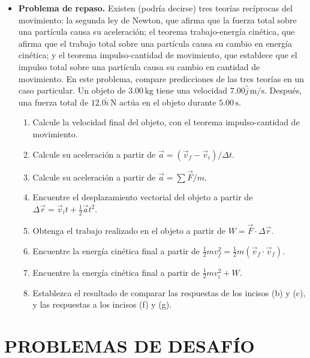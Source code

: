 \documentclass[11pt,a4paper]{article}
\begin{document}
\begin{itemize}
    \item[\textbf{51.}] \textbf{Problema de repaso.} Existen (podría decirse) tres teorías recíprocas del movimiento: la segunda ley de Newton, que afirma que la fuerza total sobre una partícula causa su aceleración; el teorema trabajo-energía cinética, que afirma que el trabajo total sobre una partícula causa su cambio en energía cinética; y el teorema impulso-cantidad de movimiento, que establece que el impulso total sobre una partícula causa su cambio en cantidad de movimiento. En este problema, compare predicciones de las tres teorías en un caso particular. Un objeto de \(3.00\,\text{kg}\) tiene una velocidad \(7.00\hat{j}\,\text{m/s}\). Después, una fuerza total de \(12.0\hat{i}\,\text{N}\) actúa en el objeto durante \(5.00\,\text{s}\).
    \begin{enumerate}
        \item Calcule la velocidad final del objeto, con el teorema impulso-cantidad de movimiento.
        \item Calcule su aceleración a partir de \(\vec{a} = (\vec{v}_f - \vec{v}_i)/\Delta t\).
        \item Calcule su aceleración a partir de \(\vec{a} = \sum \vec{F}/m\).
        \item Encuentre el desplazamiento vectorial del objeto a partir de \(\Delta \vec{r} = \vec{v}_i t + \frac{1}{2}\vec{a}t^2\).
        \item Obtenga el trabajo realizado en el objeto a partir de \(W = \vec{F} \cdot \Delta \vec{r}\).
        \item Encuentre la energía cinética final a partir de \(\frac{1}{2}m v_f^2 = \frac{1}{2}m(\vec{v}_f \cdot \vec{v}_f)\).
        \item Encuentre la energía cinética final a partir de \(\frac{1}{2}m v_i^2 + W\).
        \item Establezca el resultado de comparar las respuestas de los incisos (b) y (c), y las respuestas a los incisos (f) y (g).
    \end{enumerate}
    \vspace*{9cm}
\end{itemize}

\newpage

\section*{PROBLEMAS DE DESAFÍO}
\end{document}

